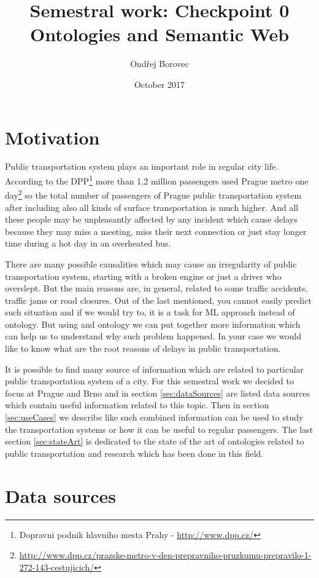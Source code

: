 \documentclass{article}
\title{Semestral work: Checkpoint 0 \\
    \large Ontologies and Semantic Web}
\author{Ondřej Borovec}
\date{October 2017}
\begin{document}
\maketitle

\section{Motivation}

Public transportation system plays an important role in regular city life. According to the DPP\footnote{Dopravni podnik hlavniho mesta Prahy - \url{http://www.dpp.cz/}} more than 1,2 million passengers used Prague metro one day\footnote{\url{http://www.dpp.cz/prazske-metro-v-den-prepravniho-pruzkumu-prepravilo-1-272-143-cestujicich/}} so the total number of passengers of Prague public transportation system after including also all kinds of surface transportation is much higher. And all these people may be unpleasantly affected by any incident which cause delays because they may miss a meeting, miss their next connection or just stay longer time during a hot day in an overheated bus.

There are many possible causalities which may cause an irregularity of public transportation system, starting with a broken engine or just a driver who overslept. But the main reasons are, in general, related to some traffic accidents, traffic jams or road closures. Out of the last mentioned, you cannot easily predict such situation and if we would try to, it is a task for ML approach instead of ontology. But using and ontology we can put together more information which can help us to understand why such problem happened. In your case we would like to know what are the root reasons of delays in public transportation.

It is possible to find many source of information which are related to particular public transportation system of a city. For this semestral work we decided to focus at Prague and Brno and in section \ref{sec:dataSources} are listed data sources which contain useful information related to this topic. Then in section \ref{sec:useCases} we describe like such combined information can be used to study the transportation systems or how it can be useful to regular passengers. The last section \ref{sec:stateArt} is dedicated to the state of the art of ontologies related to public transportation and 	research which has been done in this field.

\section{\label{sec:dataSources}Data sources}
\end{document}
